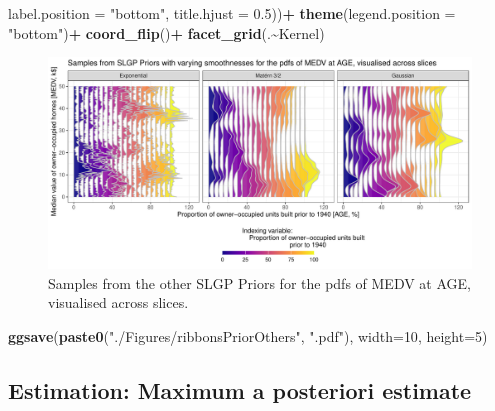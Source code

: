 \documentclass[
]{article}
\newenvironment{Shaded}{\begin{snugshade}}{\end{snugshade}}
\newcommand{\AttributeTok}[1]{\textcolor[rgb]{0.13,0.29,0.53}{#1}}
\newcommand{\DecValTok}[1]{\textcolor[rgb]{0.00,0.00,0.81}{#1}}
\newcommand{\FloatTok}[1]{\textcolor[rgb]{0.00,0.00,0.81}{#1}}
\newcommand{\FunctionTok}[1]{\textcolor[rgb]{0.13,0.29,0.53}{\textbf{#1}}}
\newcommand{\NormalTok}[1]{#1}
\newcommand{\SpecialCharTok}[1]{\textcolor[rgb]{0.81,0.36,0.00}{\textbf{#1}}}
\newcommand{\StringTok}[1]{\textcolor[rgb]{0.31,0.60,0.02}{#1}}
\begin{document}
\begin{Shaded}
\begin{Highlighting}[]
                                            \AttributeTok{label.position =} \StringTok{"bottom"}\NormalTok{,}
                                            \AttributeTok{title.hjust =} \FloatTok{0.5}\NormalTok{))}\SpecialCharTok{+}
  \FunctionTok{theme}\NormalTok{(}\AttributeTok{legend.position =} \StringTok{"bottom"}\NormalTok{)}\SpecialCharTok{+}
  \FunctionTok{coord\_flip}\NormalTok{()}\SpecialCharTok{+}
  \FunctionTok{facet\_grid}\NormalTok{(.}\SpecialCharTok{\textasciitilde{}}\NormalTok{Kernel)}
\end{Highlighting}
\end{Shaded}

\begin{figure}[H]

{\centering \includegraphics{IntroductionSLGP_files/figure-latex/SLGPplottingOtherPrior1-1} 

}

\caption{Samples from the other SLGP Priors for the pdfs of MEDV at AGE, visualised across slices.}\label{fig:SLGPplottingOtherPrior1}
\end{figure}

\begin{Shaded}
\begin{Highlighting}[]
\FunctionTok{ggsave}\NormalTok{(}\FunctionTok{paste0}\NormalTok{(}\StringTok{"./Figures/ribbonsPriorOthers"}\NormalTok{,  }\StringTok{".pdf"}\NormalTok{), }\AttributeTok{width=}\DecValTok{10}\NormalTok{, }\AttributeTok{height=}\DecValTok{5}\NormalTok{)}
\end{Highlighting}
\end{Shaded}

\subsection{Estimation: Maximum a posteriori estimate}\label{estimation-maximum-a-posteriori-estimate}
\end{document}
